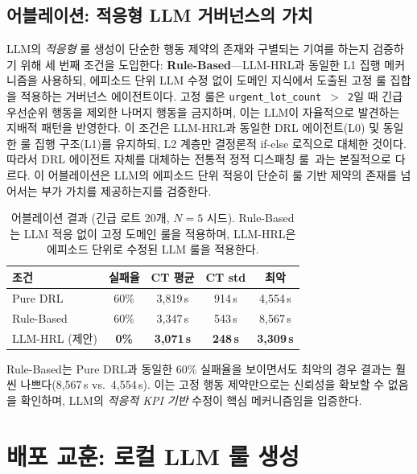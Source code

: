 \documentclass[10pt]{article}
\begin{document}
\subsection{어블레이션: 적응형 LLM 거버넌스의 가치}
\label{sec:ablation}

LLM의 \emph{적응형} 룰 생성이 단순한 행동 제약의 존재와 구별되는 기여를 하는지
검증하기 위해 세 번째 조건을 도입한다: \textbf{Rule-Based}---LLM-HRL과 동일한
L1 집행 메커니즘을 사용하되, 에피소드 단위 LLM 수정 없이 도메인 지식에서 도출된
고정 룰 집합을 적용하는 거버넌스 에이전트이다.
고정 룰은 \texttt{urgent\_lot\_count\,$>$\,2}일 때 긴급 우선순위 행동을 제외한
나머지 행동을 금지하며, 이는 LLM이 자율적으로 발견하는 지배적 패턴을 반영한다.
이 조건은 LLM-HRL과 동일한 DRL 에이전트(L0) 및 동일한 룰 집행 구조(L1)를
유지하되, L2 계층만 결정론적 if-else 로직으로 대체한 것이다. 따라서 DRL 에이전트
자체를 대체하는 전통적 정적 디스패칭 룰~\cite{lee2025}과는 본질적으로 다르다.
이 어블레이션은 LLM의 에피소드 단위 적응이 단순히 룰 기반 제약의 존재를 넘어서는
부가 가치를 제공하는지를 검증한다.

\begin{table}[thb]
\centering
\footnotesize
\caption{어블레이션 결과 (긴급 로트 20개, $N=5$ 시드).
Rule-Based는 LLM 적응 없이 고정 도메인 룰을 적용하며,
LLM-HRL은 에피소드 단위로 수정된 LLM 룰을 적용한다.}
\label{tab:ablation}
\setlength{\tabcolsep}{4pt}
\begin{tabularx}{\columnwidth}{@{}Xcccc@{}}
\toprule
\textbf{조건} & \textbf{실패율} & \textbf{CT 평균} & \textbf{CT std} & \textbf{최악} \\
\midrule
Pure DRL        & 60\%          & 3{,}819\,s & 914\,s  & 4{,}554\,s \\
Rule-Based      & 60\%          & 3{,}347\,s & 543\,s  & 8{,}567\,s \\
LLM-HRL (제안)  & \textbf{0\%}  & \textbf{3{,}071\,s} & \textbf{248\,s} & \textbf{3{,}309\,s} \\
\bottomrule
\end{tabularx}
\end{table}

Rule-Based는 Pure DRL과 동일한 60\% 실패율을 보이면서도 최악의 경우 결과는
훨씬 나쁘다(8{,}567\,s vs.\ 4{,}554\,s). 이는 고정 행동 제약만으로는 신뢰성을
확보할 수 없음을 확인하며, LLM의 \emph{적응적 KPI 기반} 수정이 핵심 메커니즘임을 입증한다.

\section{배포 교훈: 로컬 LLM 룰 생성}
\label{sec:lessons}
\end{document}
